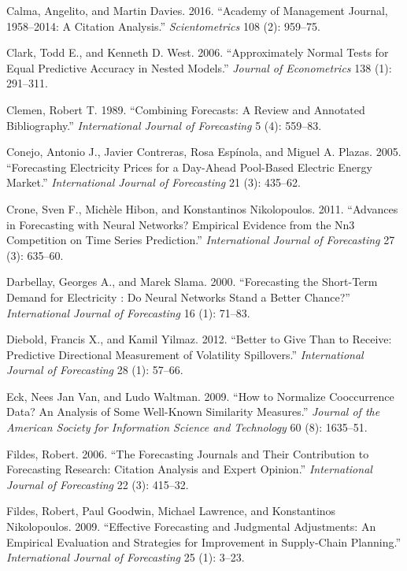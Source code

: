 \documentclass[11pt,a4paper]{elsarticle} %
\begin{document}
\hypertarget{ref-Calma2016A}{}
Calma, Angelito, and Martin Davies. 2016. ``Academy of Management
Journal, 1958--2014: A Citation Analysis.'' \emph{Scientometrics} 108
(2): 959--75.

\hypertarget{ref-Clark2006}{}
Clark, Todd E., and Kenneth D. West. 2006. ``Approximately Normal Tests
for Equal Predictive Accuracy in Nested Models.'' \emph{Journal of
Econometrics} 138 (1): 291--311.

\hypertarget{ref-Clemen1989Combining}{}
Clemen, Robert T. 1989. ``Combining Forecasts: A Review and Annotated
Bibliography.'' \emph{International Journal of Forecasting} 5 (4):
559--83.

\hypertarget{ref-Conejo2005}{}
Conejo, Antonio J., Javier Contreras, Rosa Espínola, and Miguel A.
Plazas. 2005. ``Forecasting Electricity Prices for a Day-Ahead
Pool-Based Electric Energy Market.'' \emph{International Journal of
Forecasting} 21 (3): 435--62.

\hypertarget{ref-Crone2011Advances}{}
Crone, Sven F., Michèle Hibon, and Konstantinos Nikolopoulos. 2011.
``Advances in Forecasting with Neural Networks? Empirical Evidence from
the Nn3 Competition on Time Series Prediction.'' \emph{International
Journal of Forecasting} 27 (3): 635--60.

\hypertarget{ref-Darbellay2000}{}
Darbellay, Georges A., and Marek Slama. 2000. ``Forecasting the
Short-Term Demand for Electricity : Do Neural Networks Stand a Better
Chance?'' \emph{International Journal of Forecasting} 16 (1): 71--83.

\hypertarget{ref-Diebold2012}{}
Diebold, Francis X., and Kamil Yilmaz. 2012. ``Better to Give Than to
Receive: Predictive Directional Measurement of Volatility Spillovers.''
\emph{International Journal of Forecasting} 28 (1): 57--66.

\hypertarget{ref-Eck2009How}{}
Eck, Nees Jan Van, and Ludo Waltman. 2009. ``How to Normalize
Cooccurrence Data? An Analysis of Some Well-Known Similarity Measures.''
\emph{Journal of the American Society for Information Science and
Technology} 60 (8): 1635--51.

\hypertarget{ref-Fildes2006The}{}
Fildes, Robert. 2006. ``The Forecasting Journals and Their Contribution
to Forecasting Research: Citation Analysis and Expert Opinion.''
\emph{International Journal of Forecasting} 22 (3): 415--32.

\hypertarget{ref-Fildes2009}{}
Fildes, Robert, Paul Goodwin, Michael Lawrence, and Konstantinos
Nikolopoulos. 2009. ``Effective Forecasting and Judgmental Adjustments:
An Empirical Evaluation and Strategies for Improvement in Supply-Chain
Planning.'' \emph{International Journal of Forecasting} 25 (1): 3--23.
\end{document}
